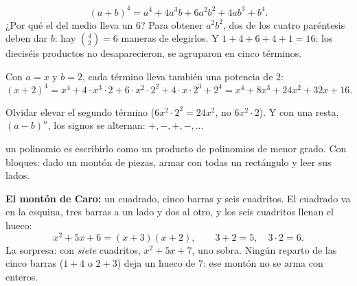\documentclass[11pt,a4paper]{article}
\def\X{1.7}\def\U{0.34}
\newcommand{\rectbloques}[2]{%
  \draw[cuadrado] (0,0) rectangle (\X,\X);
  \node[font=\small] at (\X/2,\X/2) {$x^2$};
  \foreach \i in {1,...,#1} \draw[barra] ({\X+(\i-1)*\U},0) rectangle ({\X+\i*\U},\X);
  \foreach \j in {1,...,#2} \draw[barra] (0,{\X+(\j-1)*\U}) rectangle (\X,{\X+\j*\U});
  \foreach \i in {1,...,#1} \foreach \j in {1,...,#2}
    \draw[cuadrito] ({\X+(\i-1)*\U},{\X+(\j-1)*\U}) rectangle ({\X+\i*\U},{\X+\j*\U});
  \draw[decorate,decoration={brace,mirror,amplitude=4pt},zmute] (0,-0.1) -- (\X,-0.1) node[midway,below=4pt,font=\small,text=zink]{$x$};
  \draw[decorate,decoration={brace,mirror,amplitude=4pt},zmute] (\X,-0.1) -- ({\X+#1*\U},-0.1) node[midway,below=4pt,font=\small,text=zink]{$#1$};
  \draw[decorate,decoration={brace,amplitude=4pt},zmute] (-0.1,0) -- (-0.1,\X) node[midway,left=4pt,font=\small,text=zink]{$x$};
  \draw[decorate,decoration={brace,amplitude=4pt},zmute] (-0.1,\X) -- (-0.1,{\X+#2*\U}) node[midway,left=4pt,font=\small,text=zink]{$#2$};}
\begin{document}
\begin{ejemplo}
\[ (a+b)^4=a^4+4a^3b+6a^2b^2+4ab^3+b^4 . \]
¿Por qué el del medio lleva un $6$? Para obtener $a^2b^2$, dos de los cuatro paréntesis deben dar $b$: hay
$\binom42=6$ maneras de elegirlos. Y $1+4+6+4+1=16$: los dieciséis productos no desaparecieron, se agruparon en cinco
términos.
\end{ejemplo}
\begin{ejemplo}
Con $a=x$ y $b=2$, cada término lleva también una potencia de $2$:
\[ (x+2)^4=x^4+4\cdot x^3\cdot2+6\cdot x^2\cdot2^2+4\cdot x\cdot2^3+2^4=x^4+8x^3+24x^2+32x+16 . \]
\end{ejemplo}
\begin{ojo}
Olvidar elevar el segundo término ($6x^2\cdot2^2=24x^2$, no $6x^2\cdot2$). Y con una resta, $(a-b)^n$, los signos se
alternan: $+,-,+,-,\dots$
\end{ojo}

\clearpage
{}

\begin{definicion}[Factorizar]
 un polinomio es escribirlo como un producto de polinomios de menor grado. Con bloques: dado un
montón de piezas, armar con todas un rectángulo y leer sus lados.
\end{definicion}

\begin{minipage}[c]{0.6\linewidth}
\textbf{El montón de Caro:} un cuadrado, cinco barras y seis cuadritos. El cuadrado va en la esquina, tres barras a
un lado y dos al otro, y los seis cuadritos llenan el hueco:
\[ x^2+5x+6=(x+3)(x+2),\qquad 3+2=5,\quad 3\cdot2=6 . \]
La sorpresa: con \emph{siete} cuadritos, $x^2+5x+7$, uno sobra. Ningún reparto de las cinco barras ($1+4$ o $2+3$)
deja un hueco de $7$: ese montón no se arma con enteros.
\end{minipage}\hfill
\begin{minipage}[c]{0.36\linewidth}\centering
{}
\end{minipage}
\end{document}
